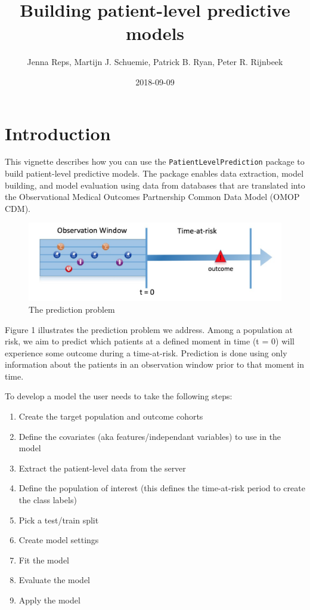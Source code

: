 \documentclass[]{article}
\title{Building patient-level predictive models}
\author{Jenna Reps, Martijn J. Schuemie, Patrick B. Ryan, Peter R. Rijnbeek}
\date{2018-09-09}
\providecommand{\tightlist}{%
  \setlength{\itemsep}{0pt}\setlength{\parskip}{0pt}}
\begin{document}
\maketitle

{
\setcounter{tocdepth}{2}
\tableofcontents
}
\section{Introduction}\label{introduction}

This vignette describes how you can use the
\texttt{PatientLevelPrediction} package to build patient-level
predictive models. The package enables data extraction, model building,
and model evaluation using data from databases that are translated into
the Observational Medical Outcomes Partnership Common Data Model (OMOP
CDM).

\begin{figure}
\centering
\includegraphics{Figure1.png}
\caption{The prediction problem}
\end{figure}

Figure 1 illustrates the prediction problem we address. Among a
population at risk, we aim to predict which patients at a defined moment
in time (t = 0) will experience some outcome during a time-at-risk.
Prediction is done using only information about the patients in an
observation window prior to that moment in time.

To develop a model the user needs to take the following steps:

\begin{enumerate}
\def\labelenumi{\arabic{enumi}.}
\tightlist
\item
  Create the target population and outcome cohorts
\item
  Define the covariates (aka features/independant variables) to use in
  the model
\item
  Extract the patient-level data from the server
\item
  Define the population of interest (this defines the time-at-risk
  period to create the class labels)
\item
  Pick a test/train split
\item
  Create model settings
\item
  Fit the model
\item
  Evaluate the model
\item
  Apply the model
\end{enumerate}
\end{document}
